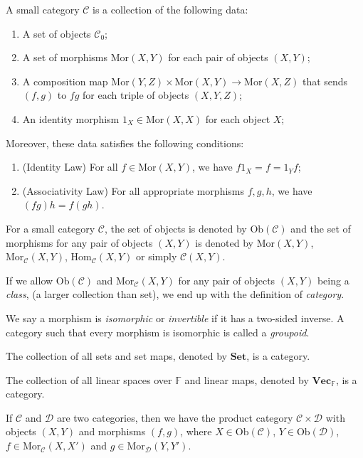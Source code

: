 \documentclass[
	11pt, %
	fleqn, %
	a4paper, %
]{LegrandOrangeBook}
\newcommand{\F}{\mathbb{F}} %
\newcommand{\C}{\mathcal{C}} %
\newcommand{\Set}{\textbf{Set}} %
\newcommand{\Vect}{\textbf{Vec}} %
\newcommand{\Mor}{\text{Mor}} %
\newcommand{\Ob}[1]{\text{Ob}(#1)} %
\begin{document}
\begin{definition}
    A small category $\C$ is a collection of the following data:
    \begin{enumerate}
        \item A set of objects $\C_0$;
        \item A set of morphisms $\Mor(X, Y)$ for each pair of objects $(X, Y)$;
        \item A composition map $\Mor(Y, Z) \times \Mor(X, Y) \to \Mor(X, Z)$ that sends $(f, g)$ to $fg$ for each triple of objects $(X, Y, Z)$;
        \item An identity morphism $1_X \in \Mor(X, X)$ for each object $X$;
    \end{enumerate}
    Moreover, these data satisfies the following conditions:
    \begin{enumerate}[label=(\alph*)]
        \item (Identity Law) For all $f \in \Mor(X, Y)$, we have $f 1_X = f = 1_Y f$;
        \item (Associativity Law) For all appropriate morphisms $f, g, h$, we have $(fg)h = f(gh)$.
    \end{enumerate}
\end{definition}

For a small category $\C$, the set of objects is denoted by $\Ob{\C}$ and the set of morphisms for any pair of objects $(X, Y)$ is denoted by $\Mor(X, Y)$, $\Mor_{\C} (X, Y)$, Hom$_{\C}(X, Y)$ or simply $\C(X, Y)$.

If we allow $\Ob{\C}$ and $\Mor_{\C}(X, Y)$ for any pair of objects $(X, Y)$ being a \emph{class}, (a larger collection than set), we end up with the definition of \emph{category}.

We say a morphism is \emph{isomorphic} or \emph{invertible} if it has a two-sided inverse. A category such that every morphism is isomorphic is called a \emph{groupoid}.

\begin{example}
    The collection of all sets and set maps, denoted by $\Set$, is a category.
\end{example}

\begin{example}
    The collection of all linear spaces over $\F$ and linear maps, denoted by $\Vect_{\F}$, is a category.
\end{example}

\begin{example}
    If $\C$ and $\mathcal{D}$ are two categories, then we have the product category $\C \times \mathcal{D}$ with objects $(X, Y)$ and morphisms $(f, g)$, where $X \in \Ob{\C}$, $Y \in \Ob{\mathcal{D}}$, $f \in \Mor_{\C}(X, X')$ and $g \in \Mor_{\mathcal{D}}(Y, Y')$.
\end{example}
\end{document}
